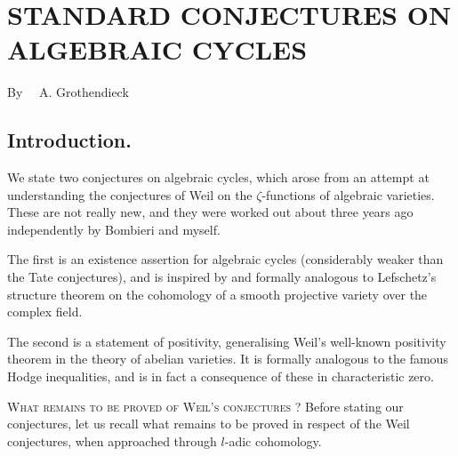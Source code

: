 \chapter[\textsc{A. Grothendieck~:} Standard Conjectures on Algebraic Cycles]{STANDARD CONJECTURES ON ALGEBRAIC CYCLES}\label{art09}

\begin{center}
By~~ A. Grothendieck
\end{center}

\setcounter{pageoriginal}{192}
\section{Introduction.}\label{art09-sec1}\pageoriginale


We state two conjectures on algebraic cycles, which arose from an attempt at understanding the conjectures of Weil on the $\zeta$-functions of algebraic varieties. These are not really new, and they were worked out about three years ago independently by Bombieri and myself.

The first is an existence assertion for algebraic cycles (considerably weaker than the Tate conjectures), and is inspired by and formally analogous to Lefschetz's structure theorem on the cohomology of a smooth projective variety over the complex field.

The second is a statement of positivity, generalising Weil's well-known positivity theorem in the theory of abelian varieties. It is formally analogous to the famous Hodge inequalities, and is in fact a consequence of these in characteristic zero.

\textsc{What remains to be proved of Weil's conjectures ?} Before stating our conjectures, let us recall what remains to be proved in respect of the Weil conjectures, when approached through $l$-adic cohomology.

